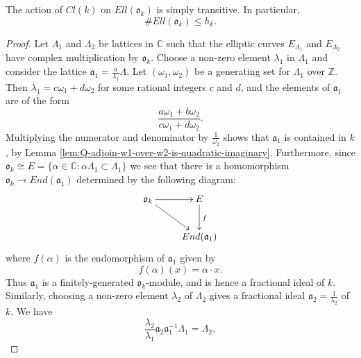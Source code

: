 \begin{thm}
  \label{thm:class-group-action-is-simply-transitive}
  The action of $Cl(k)$ on $Ell(\mathfrak{o}_{k})$ is simply transitive.  In
  particular,
  \begin{equation*}
    \# Ell(\mathfrak{o}_{k}) \leq h_{k}.
  \end{equation*}
\end{thm}
\begin{proof}
  Let $\Lambda_{1}$ and $\Lambda_{2}$ be lattices in $\mathbb{C}$ such that the
  elliptic curves $E_{\Lambda_{1}}$ and $E_{\Lambda_{2}}$ have complex multiplication
  by $\mathfrak{o}_{k}$.  Choose a non-zero element $\lambda_{1}$ in $\Lambda_{1}$
  and consider the lattice $\mathfrak{a}_{1} = \frac{a}{\lambda_{1}}\Lambda$.  Let
  $(\omega_{1},\omega_{2})$ be a generating set for $\Lambda_{1}$ over $\mathbb{Z}$.
  Then $\lambda_{1} = c\omega_{1} + d\omega_{2}$ for some rational integers $c$ and
  $d$, and the elements of $\mathfrak{a}_{1}$ are of the form
  \begin{equation*}
    \frac{a\omega_{1} + b\omega_{2}}{c\omega_{1} + d\omega_{2}}.
  \end{equation*}
  Multiplying the numerator and denominator by $\frac{1}{\omega_{2}}$ shows that
  $\mathfrak{a}_{1}$ is contained in $k$, by Lemma
  \ref{lem:Q-adjoin-w1-over-w2-is-quadratic-imaginary}.  Furthermore, since
  $\mathfrak{o}_{k} \cong E = \{\alpha \in \mathbb{C} : \alpha \Lambda_{1} \subset
  \Lambda_{1} \}$ we see that there is a homomorphism $\mathfrak{o}_{k} \rightarrow
  End(\mathfrak{a}_{1})$ determined by the following diagram:
  \begin{equation*}
    \xymatrix{
      \mathfrak{o}_{k} \ar[rd] \ar[r] & E \ar[d]^{f}\\
      &End(\mathfrak{a}_{1})
    }
  \end{equation*}
  where $f(\alpha)$ is the endomorphism of $\mathfrak{a}_{1}$ given by
  \begin{equation*}
    f(\alpha)(x) = \alpha \cdot x.
  \end{equation*}
  Thus $\mathfrak{a}_{1}$ is a finitely-generated $\mathfrak{o}_{k}$-module, and is
  hence a fractional ideal of $k$.  Similarly, choosing a non-zero element
  $\lambda_{2}$ of $\Lambda_{2}$ gives a fractional ideal $\mathfrak{a}_{2} =
  \frac{1}{\lambda_{2}}$ of $k$.  We have
  \begin{equation*}
    \frac{\lambda_{2}}{\lambda_{1}}\mathfrak{a}_{2}\mathfrak{a}_{1}^{-1}\Lambda_{1} = \Lambda_{2},
  \end{equation*}

\end{proof}
